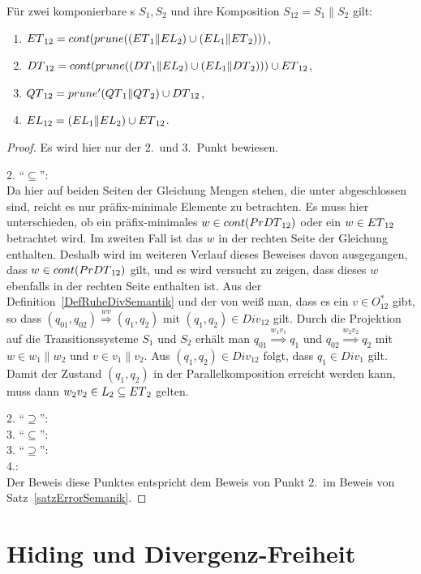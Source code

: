 \begin{satz}
  Für zwei komponierbare \EIO{}s $S_1, S_2$ und ihre Komposition
  $S_{12}=S_1\|S_2$ gilt:
  \begin{enumerate}
    \item $ET{}_{12}=cont (prune ((ET{}_1\|EL{}_2)\cup
      (EL{}_1\|ET{}_2)))$,
    \item $DT{}_{12}=cont (prune ((DT{}_1\|EL{}_2)\cup
      (EL{}_1\|DT{}_2)))\cup ET{}_{12}$,
    \item $QT{}_{12}=prune' (QT{}_1\|QT{}_2)\cup DT{}_{12}$,
    \item $EL{}_{12}=(EL{}_1\|EL{}_2)\cup ET{}_{12}$.
  \end{enumerate}
\end{satz}

\begin{proof} Es wird hier nur der 2.\ und 3.\ Punkt bewiesen.

  2. ``$\subseteq$'':\\
  Da hier auf beiden Seiten der Gleichung Mengen stehen, die unter \cont{}
  abgeschlossen sind, reicht es nur präfix-minimale Elemente zu betrachten. Es
  muss hier unterschieden, ob ein präfix-minimales $w\in cont{}(PrDT{}_{12})$
  oder ein $w\in ET{}_{12}$ betrachtet wird. Im zweiten Fall ist das $w$ in
  der rechten Seite der Gleichung enthalten. Deshalb wird im weiteren Verlauf
  dieses Beweises davon ausgegangen, dass $w\in cont{}(PrDT{}_{12})$ gilt,
  und es wird versucht zu zeigen, dass dieses $w$ ebenfalls in der rechten
  Seite enthalten ist. Aus der Definition~\ref{DefRuheDivSemantik} und der von
  \prune{} weiß man, dass es ein $v\in O^*_{12}$ gibt, so dass $(q_{01},q_{02})
  \overset{wv}{\Rightarrow} (q_1,q_2)$ mit $(q_1,q_2)\in Div_{12}$ gilt. Durch
  die Projektion auf die Transitionssysteme $S_1$ und $S_2$ erhält man $q_{01}
  \overset{w_1v_1}{\Rightarrow} q_1$ und $q_{02} \overset{w_2v_2}{\Rightarrow}
  q_2$ mit $w\in w_1\|w_2$ und $v\in v_1\|v_2$. Aus $(q_1,q_2)\in Div_{12}$
  folgt, dass \oBdA{} $q_1\in Div_1$ gilt. Damit der Zustand $(q_1,q_2)$ in der
  Parallelkomposition erreicht werden kann, muss dann $w_2v_2\in L_2\subseteq
  ET{}_2$ gelten.

  2. ``$\supseteq$'':\\

  3. ``$\subseteq$'':\\

  3. ``$\supseteq$'':\\

  4.:\\
  Der Beweis diese Punktes entspricht dem Beweis von Punkt 2.\ im Beweis von
  Satz~\ref{satzErrorSemanik}.
\end{proof}

\section{Hiding und Divergenz-Freiheit}
